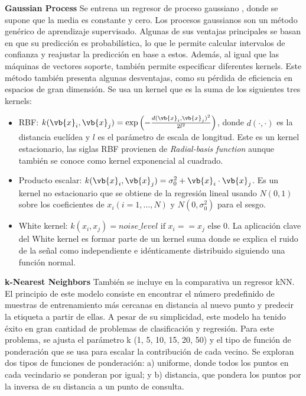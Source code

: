 \textbf{Gaussian Process} {} Se entrena un regresor de proceso gaussiano \cite{Rasmussen2006}, donde se supone que la media es constante y cero. Los procesos gaussianos son un método genérico de aprendizaje supervisado. Algunas de sus ventajas principales se basan en que su predicción es probabilística, lo que le permite calcular intervalos de confianza y reajustar la predicción en base a estos. Además, al igual que las máquinas de vectores soporte, también permite especificar diferentes kernels. Este método también presenta algunas desventajas, como su pérdida de eficiencia en espacios de gran dimensión.  %
Se usa un kernel que es la suma de los siguientes tres kernels:
\begin{itemize}
\item RBF: $k(\vb{x}_i, \vb{x}_j) = \text{exp}\left(- \frac{d(\vb{x}_i, \vb{x}_j)^2}{2l^2} \right)$, donde $d(\cdot, \cdot)$ es la distancia euclídea y $l$ es el parámetro de escala de longitud. Este es un kernel estacionario, las siglas RBF provienen de \emph{Radial-basis function} aunque también se conoce como kernel exponencial al cuadrado.
\item Producto escalar: $k(\vb{x}_i, \vb{x}_j) = \sigma_0 ^ 2 + \vb{x}_i \cdot \vb{x}_j$. Es un kernel no estacionario que se obtiene de la regresión lineal usando $N(0, 1)$ sobre los coeficientes de $x_i (i = 1, \ldots, N)$ y $N(0, \sigma_0^2)$ para el sesgo.
\item White kernel: $k(x_i, x_j) = noise\_level \text{ if } x_i == x_j \text{ else } 0$. La aplicación clave del White kernel es formar parte de un kernel suma donde se explica el ruido de la señal como independiente e idénticamente distribuido siguiendo una función normal.
\end{itemize}

\vspace{0.5cm}

\textbf{k-Nearest Neighbors} {} También se incluye en la comparativa un regresor kNN. El principio de este modelo consiste en encontrar el número predefinido de muestras de entrenamiento más cercanas en distancia al nuevo punto y predecir la etiqueta a partir de ellas. A pesar de su simplicidad, este modelo ha tenido éxito en gran cantidad de problemas de clasificación y regresión.  %
Para este problema, se ajusta el parámetro k (1, 5, 10, 15, 20, 50) y el tipo de función de ponderación que se usa para escalar la contribución de cada vecino. Se exploran dos tipos de funciones de ponderación: a) uniforme, donde todos los puntos en cada vecindario se ponderan por igual; y b) distancia, que pondera los puntos por la inversa de su distancia a un punto de consulta.

